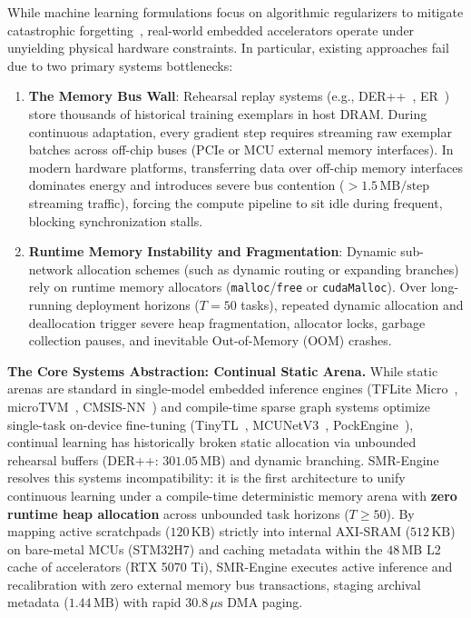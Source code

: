 \documentclass{article}
\begin{document}
While machine learning formulations focus on algorithmic regularizers to mitigate catastrophic forgetting~\cite{mccloskey1989catastrophic, French1999, abraham2005memory, kirkpatrick2017overcoming, zenke2017continual, buzzega2020dark}, real-world embedded accelerators operate under unyielding physical hardware constraints. In particular, existing approaches fail due to two primary systems bottlenecks:
\begin{enumerate}\itemsep 0.5pt \parsep 0pt
    \item \textbf{The Memory Bus Wall}: Rehearsal replay systems (e.g., DER++~\cite{buzzega2020dark}, ER~\cite{chaudhry2019tiny}) store thousands of historical training exemplars in host DRAM. During continuous adaptation, every gradient step requires streaming raw exemplar batches across off-chip buses (PCIe or MCU external memory interfaces). In modern hardware platforms, transferring data over off-chip memory interfaces dominates energy and introduces severe bus contention ($>1.5\,\text{MB/step}$ streaming traffic), forcing the compute pipeline to sit idle during frequent, blocking synchronization stalls.
    \item \textbf{Runtime Memory Instability and Fragmentation}: Dynamic sub-network allocation schemes (such as dynamic routing or expanding branches) rely on runtime memory allocators (\texttt{malloc}/\texttt{free} or \texttt{cudaMalloc}). Over long-running deployment horizons ($T = 50$ tasks), repeated dynamic allocation and deallocation trigger severe heap fragmentation, allocator locks, garbage collection pauses, and inevitable Out-of-Memory (OOM) crashes.
\end{enumerate}

\noindent\textbf{The Core Systems Abstraction: Continual Static Arena.} While static arenas are standard in single-model embedded inference engines (TFLite Micro~\cite{david2021tensorflow}, microTVM~\cite{chen2018tvm}, CMSIS-NN~\cite{lai2018cmsis}) and compile-time sparse graph systems optimize single-task on-device fine-tuning (TinyTL~\cite{cai2020tinytl}, MCUNetV3~\cite{lin2022mcunet}, PockEngine~\cite{zhu2023pockengine}), continual learning has historically broken static allocation via unbounded rehearsal buffers (DER++: $301.05\,\text{MB}$) and dynamic branching. SMR-Engine resolves this systems incompatibility: it is the first architecture to unify continuous learning under a compile-time deterministic memory arena with \textbf{zero runtime heap allocation} across unbounded task horizons ($T \ge 50$). By mapping active scratchpads ($120\,\text{KB}$) strictly into internal AXI-SRAM ($512\,\text{KB}$) on bare-metal MCUs (STM32H7) and caching metadata within the $48\,\text{MB}$ L2 cache of accelerators (RTX 5070 Ti), SMR-Engine executes active inference and recalibration with zero external memory bus transactions, staging archival metadata ($1.44\,\text{MB}$) with rapid $30.8\,\mu\text{s}$ DMA paging.
\end{document}
